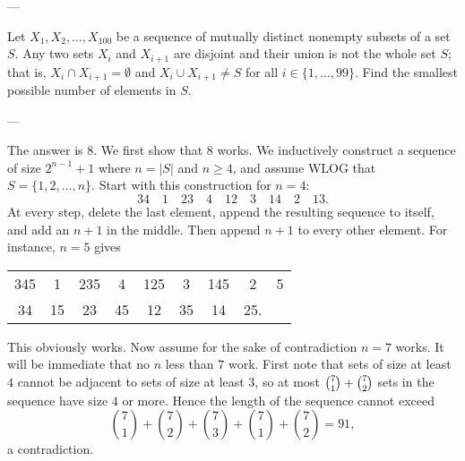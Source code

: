 
---

Let $X_1,X_2,\ldots,X_{100}$ be a sequence of mutually distinct nonempty subsets of a set $S$. Any two sets $X_i$ and $X_{i+1}$ are disjoint and their union is not the whole set $S$; that is, $X_i\cap X_{i+1}=\emptyset$ and $X_i\cup X_{i+1}\ne S$ for all $i\in\{1,\ldots,99\}$. Find the smallest possible number of elements in $S$.

---

The answer is $8$. We first show that $8$ works. We inductively construct a sequence of size $2^{n-1}+1$ where $n=|S|$ and $n\ge 4$, and assume WLOG that $S=\{1,2,\ldots,n\}$. Start with this construction for $n=4$: \[34\quad1\quad23\quad4\quad12\quad3\quad14\quad2\quad13.\]
At every step, delete the last element, append the resulting sequence to itself, and add an $n+1$ in the middle. Then append $n+1$ to every other element. For instance, $n=5$ gives
\begin{center}
    \begin{tabular}{c c c c c c c c c}
        345&1&235&4&125&3&145&2&5\\
        34&15&23&45&12&35&14&25.&
    \end{tabular}
\end{center}
This obviously works. Now assume for the sake of contradiction $n=7$ works. It will be immediate that no $n$ less than $7$ work. First note that sets of size at least $4$ cannot be adjacent to sets of size at least $3$, so at most $\tbinom71+\tbinom72$ sets in the sequence have size $4$ or more. Hence the length of the sequence cannot exceed \[\binom71+\binom72+\binom73+\binom71+\binom72=91,\]
a contradiction.
